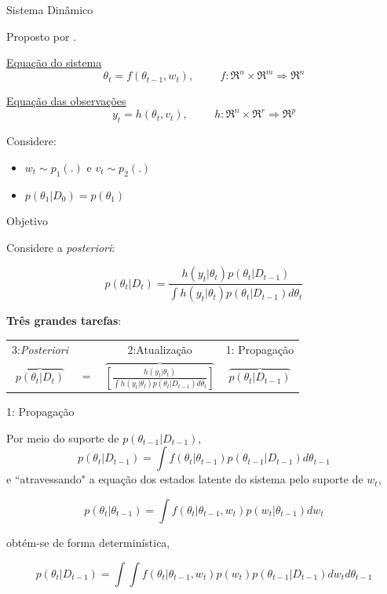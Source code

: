 \documentclass{beamer}
\begin{document}
\begin{frame}{Sistema Dinâmico}

Proposto por \cite{gordon}.

\vspace{0.5cm}

\underline{Equação do sistema}
$$\theta_t = f(\theta_{t-1},w_t), \hspace{1cm}f: \Re^n \times \Re^m \Rightarrow \Re^n$$

\pause

\underline{Equação das observações}
$$y_t = h(\theta_{t} , v_t), \hspace{1cm} h: \Re^n\times \Re^r \Rightarrow \Re^p$$

\pause

Considere:
\begin{itemize}
\item $w_t \sim p_1(.)$ e $v_t\sim p_2(.)$
\item $p(\theta_1|D_0)=p(\theta_1)$
\end{itemize}

\end{frame}


\begin{frame}{Objetivo}

Considere a \textit{posteriori}:

\vspace{0.5cm}

$$
p(\theta_t|D_t)  = \frac{h(y_t|\theta_t)  p(\theta_t|D_{t-1}) }{\int h(y_t|\theta_t)p(\theta_t|D_{t-1})d \theta_t}
$$

\pause

\textbf{Três grandes tarefas}:
\vspace{0.5cm}

\begin{tabular}{cccc}
3:\textit{Posteriori} & & 2:Atualização & 1: Propagação \\
$\overbrace{p(\theta_t|D_t)} $ & $=$ & $\overbrace{\left[\frac{h(y_t|\theta_t)}{\int h(y_t|\theta_t)p(\theta_t|D_{t-1})d \theta_t}\right]} $& $\overbrace{p(\theta_t|D_{t-1})}$
\end{tabular}

\end{frame}



\begin{frame}{1: Propagação}

Por meio do suporte de $p(\theta_{t-1}|D_{t-1})$,
$$
p(\theta_t|D_{t-1}) = \int f(\theta_t|\theta_{t-1})p(\theta_{t-1}|D_{t-1})d\theta_{t-1}
$$
\pause
e ``atravessando" a equação dos estados latente do sistema pelo suporte de $w_t$, 

$$
p(\theta_t|\theta_{t-1}) = \int f(\theta_t|\theta_{t-1},w_{t})p(w_{t}|\theta_{t-1})dw_{t}
$$
\pause

obtém-se de forma determinística,

$$
p(\theta_t|D_{t-1}) = \int \int f(\theta_t|\theta_{t-1},w_{t})p(w_{t})p(\theta_{t-1}|D_{t-1})dw_{t}d\theta_{t-1}
$$


\end{frame}
\end{document}
